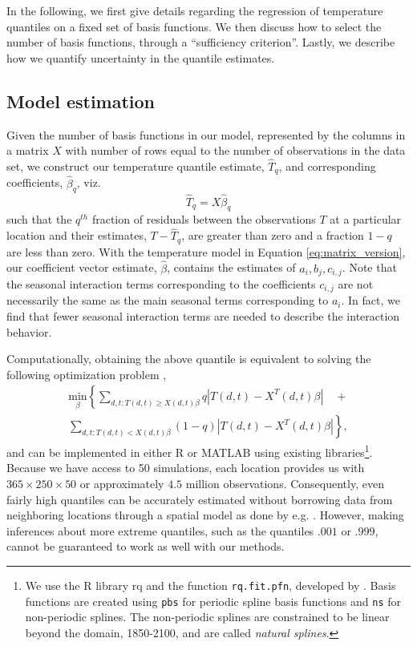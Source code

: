 \documentclass{ametsoc}
\begin{document}
In the following, we first give details regarding the regression of temperature quantiles on a fixed set of basis functions. We then discuss how to select the number of basis functions, through a ``sufficiency criterion''. Lastly, we describe how we quantify uncertainty in the quantile estimates.

 \subsection{Model estimation}
 Given the number of basis functions in our model, represented by the columns in a matrix $X$ with number of rows equal to the number of observations in the data set,  we construct our temperature quantile estimate, $\hat{T}_q$, and corresponding coefficients, $\hat{\beta}_q$, viz.
 \begin{equation}
 \hat{T}_q = X\hat{\beta}_q
 \end{equation}
such that the $q^{th}$ fraction of residuals between the observations $T$ at a particular location and their estimates, $T - \hat{T}_q$, are greater than zero and a fraction $1-q$ are less than zero. With the temperature model in Equation \ref{eq:matrix_version}, our coefficient vector estimate, $\hat{\beta}$, contains the estimates of $a_i, b_j, c_{i,j}$. Note that the seasonal interaction terms corresponding to the coefficients $c_{i,j}$ are not necessarily the same as the main seasonal terms corresponding to $a_i$. In fact, we find that fewer seasonal interaction terms are needed to describe the interaction behavior. 

Computationally, obtaining the above quantile is equivalent to solving the following optimization problem \citep{koenker1978regression},
\begin{multline}
\underset{\beta}{\text{min}}\left\{ \sum_{d,t: T(d, t) \geq X(d, t)\beta} q|T(d,t) - X^T(d,t)\beta| \right. \quad+  \\
 \left. \sum_{d,t: T(d, t) < X(d, t)\beta} (1 - q)|T(d,t) - X^T(d,t)\beta| \right\},
\end{multline}
and can be implemented in either R or MATLAB using existing libraries\footnote{We use the R library rq and the function \texttt{rq.fit.pfn}, developed by \citet{portnoy1997gaussian}. Basis functions are created using \texttt{pbs} for periodic spline basis functions and \texttt{ns} for non-periodic splines. The non-periodic splines are constrained to be linear beyond the domain, 1850-2100, and are called \emph{natural splines}.}. Because we have access to 50 simulations, each location provides us with $365 \times 250 \times 50$ or approximately $4.5$ million observations. Consequently, even fairly high quantiles can be accurately estimated without borrowing data from neighboring locations through a spatial model as done by e.g. \citet{reich2011bayesian}. However, making inferences about more extreme quantiles, such as the quantiles $.001$ or $.999$, cannot be guaranteed to work as well with our methods.
\end{document}
